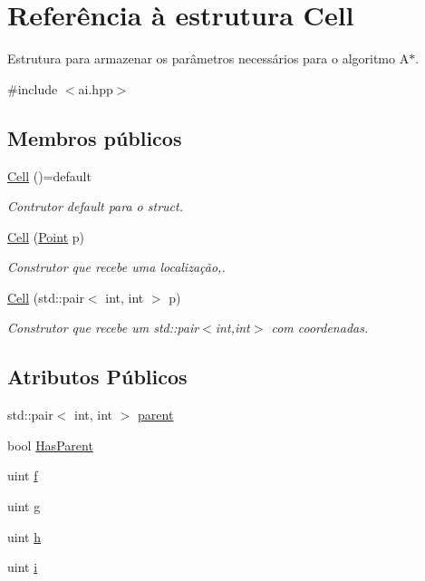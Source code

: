 \hypertarget{structCell}{}\section{Referência à estrutura Cell}
\label{structCell}


Estrutura para armazenar os parâmetros necessários para o algoritmo A$\ast$.  




{\ttfamily \#include $<$ai.\+hpp$>$}

\subsection*{Membros públicos}
\begin{DoxyCompactItemize}
\item 
\hyperlink{structCell_a8a4b210b76ae4387021b2632d0c5c3c1}{Cell} ()=default
\begin{DoxyCompactList}\small\item\em Contrutor default para o struct. \end{DoxyCompactList}\item 
\hyperlink{structCell_aeebfbd5f1dc0312e3687361b9ae87f72}{Cell} (\hyperlink{structPoint}{Point} p)
\begin{DoxyCompactList}\small\item\em Construtor que recebe uma localização,. \end{DoxyCompactList}\item 
\hyperlink{structCell_a311ac48a496fd17ba0059983ea3bd351}{Cell} (std\+::pair$<$ int, int $>$ p)
\begin{DoxyCompactList}\small\item\em Construtor que recebe um std\+::pair$<$int,int$>$ com coordenadas. \end{DoxyCompactList}\end{DoxyCompactItemize}
\subsection*{Atributos Públicos}
\begin{DoxyCompactItemize}
\item 
std\+::pair$<$ int, int $>$ \hyperlink{structCell_a0e60e7ac46f80dc1046963d7a0484288}{parent}
\item 
bool \hyperlink{structCell_ae352e96b13979220a2af863e2de1bcc7}{Has\+Parent}
\item 
uint \hyperlink{structCell_ac55c1065864169fabe0172e0effa6091}{f}
\item 
uint \hyperlink{structCell_acd60bf8f417807a2b1e5beaa1a8ddb3e}{g}
\item 
uint \hyperlink{structCell_a0c169e75fb8f499906e2fb4b135444ba}{h}
\item 
uint \hyperlink{structCell_ae36083edff27d1258eb42d6dadd97a0c}{i}
\end{DoxyCompactItemize}


